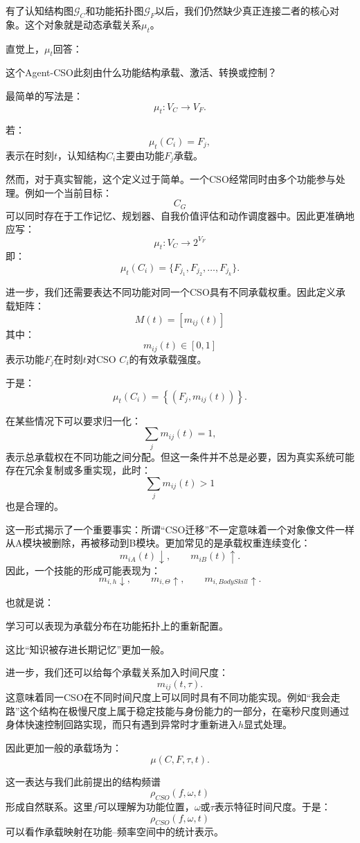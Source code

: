 有了认知结构图$\mathcal G_C$和功能拓扑图$\mathcal G_F$以后，我们仍然缺少真正连接二者的核心对象。这个对象就是动态承载关系$\mu_t$。

直觉上，$\mu_t$回答：
\begin{statementbox}
这个Agent-CSO此刻由什么功能结构承载、激活、转换或控制？
\end{statementbox}

最简单的写法是：
\[
\boxed{
\mu_t:
V_C
\rightarrow
V_F.
}
\]

若：
\[
\mu_t(C_i)=F_j,
\]
表示在时刻$t$，认知结构$C_i$主要由功能$F_j$承载。

然而，对于真实智能，这个定义过于简单。一个CSO经常同时由多个功能参与处理。例如一个当前目标：
\[
C_G
\]
可以同时存在于工作记忆、规划器、自我价值评估和动作调度器中。因此更准确地应写：
\[
\boxed{
\mu_t:
V_C
\rightarrow
2^{V_F}
}
\]
即：
\[
\mu_t(C_i)
=
\{F_{j_1},F_{j_2},\ldots,F_{j_k}\}.
\]

进一步，我们还需要表达不同功能对同一个CSO具有不同承载权重。因此定义承载矩阵：
\[
\boxed{
M(t)
=
[m_{ij}(t)]
}
\]
其中：
\[
m_{ij}(t)
\in[0,1]
\]
表示功能$F_j$在时刻$t$对CSO $C_i$的有效承载强度。

于是：
\[
\mu_t(C_i)
=
\left\{
(F_j,m_{ij}(t))
\right\}.
\]

在某些情况下可以要求归一化：
\[
\sum_jm_{ij}(t)=1,
\]
表示总承载权在不同功能之间分配。但这一条件并不总是必要，因为真实系统可能存在冗余复制或多重实现，此时：
\[
\sum_jm_{ij}(t)>1
\]
也是合理的。

这一形式揭示了一个重要事实：所谓“CSO迁移”不一定意味着一个对象像文件一样从A模块被删除，再被移动到B模块。更加常见的是承载权重连续变化：
\[
m_{iA}(t)\downarrow,
\qquad
m_{iB}(t)\uparrow.
\]
因此，一个技能的形成可能表现为：
\[
m_{i,h}\downarrow,
\qquad
m_{i,\Theta}\uparrow,
\qquad
m_{i,BodySkill}\uparrow.
\]

也就是说：
\begin{statementbox}
学习可以表现为承载分布在功能拓扑上的重新配置。
\end{statementbox}

这比“知识被存进长期记忆”更加一般。

进一步，我们还可以给每个承载关系加入时间尺度：
\[
m_{ij}(t,\tau).
\]
这意味着同一CSO在不同时间尺度上可以同时具有不同功能实现。例如“我会走路”这个结构在极慢尺度上属于稳定技能与身份能力的一部分，在毫秒尺度则通过身体快速控制回路实现，而只有遇到异常时才重新进入$h$显式处理。

因此更加一般的承载场为：
\[
\boxed{
\mu(C,F,\tau,t).
}
\]

这一表达与我们此前提出的结构频谱
\[
\rho_{CSO}(f,\omega,t)
\]
形成自然联系。这里$f$可以理解为功能位置，$\omega$或$\tau$表示特征时间尺度。于是：
\[
\boxed{
\rho_{CSO}(f,\omega,t)
}
\]
可以看作承载映射在功能--频率空间中的统计表示。

